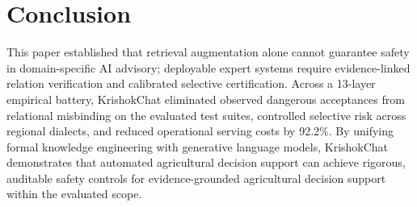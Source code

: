 \documentclass[11pt,a4paper]{article}
\begin{document}
\section{Conclusion}
\label{sec:conclusion}

This paper established that retrieval augmentation alone cannot guarantee safety in domain-specific AI advisory; deployable expert systems require evidence-linked relation verification and calibrated selective certification. Across a 13-layer empirical battery, KrishokChat eliminated observed dangerous acceptances from relational misbinding on the evaluated test suites, controlled selective risk across regional dialects, and reduced operational serving costs by 92.2\%. By unifying formal knowledge engineering with generative language models, KrishokChat demonstrates that automated agricultural decision support can achieve rigorous, auditable safety controls for evidence-grounded agricultural decision support within the evaluated scope.
\end{document}
